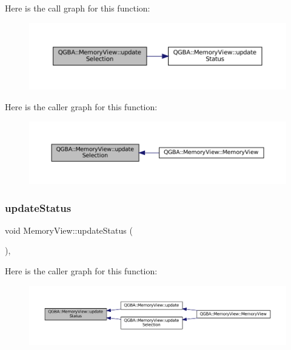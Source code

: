 Here is the call graph for this function\+:
\nopagebreak
\begin{figure}[H]
\begin{center}
\leavevmode
\includegraphics[width=350pt]{class_q_g_b_a_1_1_memory_view_a03e597889e524eda48b0b3c89a23737c_cgraph}
\end{center}
\end{figure}
Here is the caller graph for this function\+:
\nopagebreak
\begin{figure}[H]
\begin{center}
\leavevmode
\includegraphics[width=350pt]{class_q_g_b_a_1_1_memory_view_a03e597889e524eda48b0b3c89a23737c_icgraph}
\end{center}
\end{figure}
\mbox{\label{class_q_g_b_a_1_1_memory_view_a3a0e363a2005a30876b2a9f0967a0f67}} 
\subsubsection{\texorpdfstring{update\+Status}{updateStatus}}
{\footnotesize\ttfamily void Memory\+View\+::update\+Status (\begin{DoxyParamCaption}{ }\end{DoxyParamCaption})\hspace{0.3cm}{\ttfamily [private]}, {\ttfamily [slot]}}

Here is the caller graph for this function\+:
\nopagebreak
\begin{figure}[H]
\begin{center}
\leavevmode
\includegraphics[width=350pt]{class_q_g_b_a_1_1_memory_view_a3a0e363a2005a30876b2a9f0967a0f67_icgraph}
\end{center}
\end{figure}


